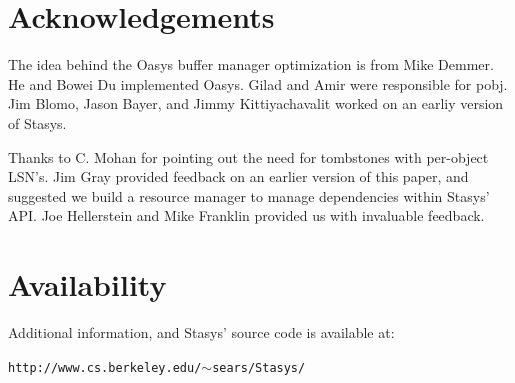 \documentclass[letterpaper,twocolumn,10pt]{article}
\newcommand{\yad}{Stasys\xspace}
\newcommand{\yads}{Stasys'\xspace}
\newcommand{\oasys}{Oasys\xspace}
\begin{document}
\section{Acknowledgements}

The idea behind the \oasys buffer manager optimization is from Mike
Demmer.  He and Bowei Du implemented \oasys.  Gilad and Amir were
responsible for pobj.  Jim Blomo, Jason Bayer, and Jimmy
Kittiyachavalit worked on an earliy version of \yad.

Thanks to C. Mohan for pointing out the need for tombstones with
per-object LSN's.  Jim Gray provided feedback on an earlier version of
this paper, and suggested we build a resource manager to manage
dependencies within \yads API.  Joe Hellerstein and Mike Franklin
provided us with invaluable feedback.

\section{Availability}

Additional information, and \yads source code is available at:

\begin{center}
{\small{\tt http://www.cs.berkeley.edu/\ensuremath{\sim}sears/\yad/}}
\end{center}

{\footnotesize 
\nocite{*}
}

\theendnotes
\end{document}
